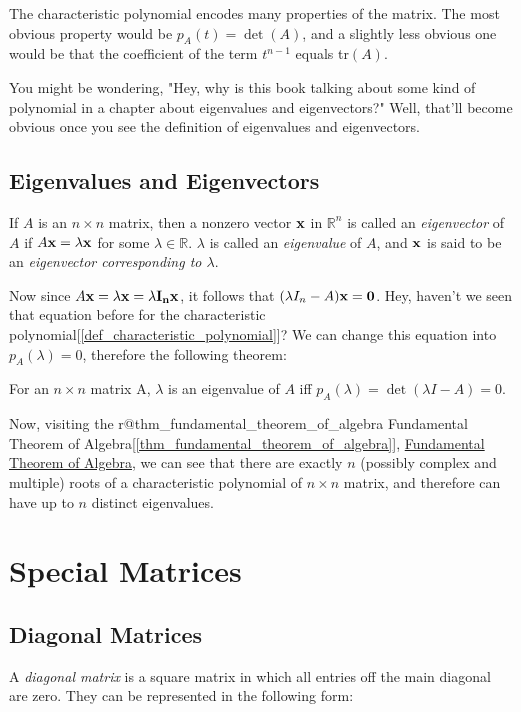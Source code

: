 \documentclass{report}
\begin{document}
			The characteristic polynomial encodes many properties of the matrix. The most obvious property would be $p_A(t)=\det(A)$, and a slightly less obvious one would be that the coefficient of the term $t^{n-1}$ equals tr$(A)$.
			
			You might be wondering, "Hey, why is this book talking about some kind of polynomial in a chapter about eigenvalues and eigenvectors?" Well, that'll become obvious once you see the definition of eigenvalues and eigenvectors.
		
		\subsection{Eigenvalues and Eigenvectors}
		\begin{defn}
			If $A$ is an $n \times n$ matrix, then a nonzero vector $\bf{x}$ in $\mathbb{R}^n$ is called an \emph{eigenvector} of $A$ if $A\bf{x}=\lambda \bf{x}$ for some $\lambda \in \mathbb{R}$. $\lambda$ is called an \emph{eigenvalue} of $A$, and $\bf{x}$ is said to be an \emph{eigenvector corresponding to $\lambda$}.
		\end{defn}
		
		Now since $A\bf{x}=\lambda \bf{x}=\lambda I_n \bf{x}$, it follows that $(\lambda I_n - A)\bf{x}=\bf{0}$. Hey, haven't we seen that equation before for the characteristic polynomial[\ref{def_characteristic_polynomial}]? We can change this equation into $p_A(\lambda)=0$, therefore the following theorem:
		
		\begin{thm}
			For an $n \times n$ matrix A, $\lambda$ is an eigenvalue of $A$ iff $p_A(\lambda)=\det(\lambda I-A)=0$.
		\end{thm}
		
		Now, visiting the
		\ifcsname r@thm_fundamental_theorem_of_algebra \endcsname
		Fundamental Theorem of Algebra[\ref{thm_fundamental_theorem_of_algebra}],
		\else
		\href{https://en.wikipedia.org/wiki/Fundamental_theorem_of_algebra}{Fundamental Theorem of Algebra},
		\fi
		we can see that there are exactly $n$ (possibly complex and multiple) roots of a characteristic polynomial of $n \times n$ matrix, and therefore can have up to $n$ distinct eigenvalues.
	
	\section{Special Matrices}
		\subsection{Diagonal Matrices}
		A \emph{diagonal matrix} is a square matrix in which all entries off the main diagonal are zero. They can be represented in the following form:
		
\end{document}
